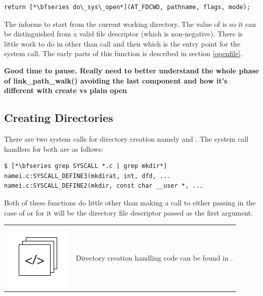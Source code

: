 \begin{lstlisting}
return [*\bfseries do\_sys\_open*](AT_FDCWD, pathname, flags, mode);
\end{lstlisting}

\noindent
The  informs  to start from the current working directory. The value of  is  so it can be distinguished from a valid file descriptor (which is non-negative). There is little work to do in  other than call  and then  which is the entry point for the   system call. The early parts of this function is described in section \ref{openfile}.

\textbf{Good time to pause. Really need to better understand the whole phase of link\_path\_walk() avoiding the last component and how it's different with create vs plain open}


\subsection{Creating Directories}\label{vfs-mkdir}

There are two system calls for directory creation namely  and . The system call handlers for both are as follows:

\begin{lstlisting}
$ [*\bfseries grep SYSCALL *.c | grep mkdir*]
namei.c:SYSCALL_DEFINE3(mkdirat, int, dfd, ...
namei.c:SYSCALL_DEFINE2(mkdir, const char __user *, ...
\end{lstlisting}

\noindent
Both of these functions do little other than making a call to  either passing  in the case of  or for  it will be the directory file descriptor passed as the first argument.

\begin{table}[h]
\begin{tabular}{ll}
\parbox[l]{0.6in}{\includegraphics[scale=0.8]{figures/src-xref.pdf}} & \parbox[l]{4in}{\small{Directory creation handling code can be found in .}}
\end{tabular}
\end{table}

